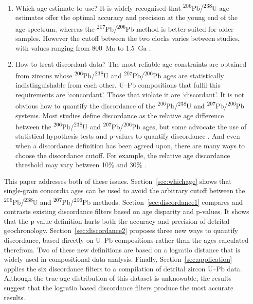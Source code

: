 \documentclass[gchron, manuscript]{copernicus}
\begin{document}
\begin{enumerate}
\item Which age estimate to use? It is widely recognised that
  \textsuperscript{206}Pb/\textsuperscript{238}U age estimates offer
  the optimal accuracy and precision at the young end of the age
  spectrum, whereas the
  \textsuperscript{207}Pb/\textsuperscript{206}Pb method is better
  suited for older samples. However the cutoff between the two clocks
  varies between studies, with values ranging from 800~Ma to 1.5~Ga
  \citep{gehrels2011,spencer2016}.
\item How to treat discordant data? The most reliable age constraints
  are obtained from zircons whose
  \textsuperscript{206}Pb/\textsuperscript{238}U and
  \textsuperscript{207}Pb/\textsuperscript{206}Pb ages are
  statistically indistinguishable from each other. U--Pb compositions
  that fulfil this requirements are `concordant'. Those that violate
  it are `discordant'. It is not obvious how to quantify the
  discordance of the \textsuperscript{206}Pb/\textsuperscript{238}U
  and \textsuperscript{207}Pb/\textsuperscript{206}Pb systems. Most
  studies define discordance as the relative age difference between
  the \textsuperscript{206}Pb/\textsuperscript{238}U and
  \textsuperscript{207}Pb/\textsuperscript{206}Pb ages, but some
  advocate the use of statistical hypothesis tests and p-values to
  quantify discordance \citep{spencer2016}. And even when a
  discordance definition has been agreed upon, there are many ways to
  choose the discordance cutoff. For example, the relative age
  discordance threshold may vary between 10\% and 30\%
  \citep{gehrels2011}.
\end{enumerate}

This paper addresses both of these issues. Section~\ref{sec:whichage}
shows that single-grain concordia ages can be used to avoid the
arbitrary cutoff between the
\textsuperscript{206}Pb/\textsuperscript{238}U and
\textsuperscript{207}Pb/\textsuperscript{206}Pb
methods. Section~\ref{sec:discordance1} compares and contrasts
existing discordance filters based on age disparity and p-values. It
shows that the p-value definition hurts both the accuracy and
precision of detrital geochronology. Section~\ref{sec:discordance2}
proposes three new ways to quantify discordance, based directly on
U--Pb compositions rather than the ages calculated therefrom. Two of
these new definitions are based on a logratio distance that is widely
used in compositional data analysis. Finally,
Section~\ref{sec:application} applies the six discordance filters to a
compilation of detrital zircon U--Pb data. Although the true age
distribution of this dataset is unknowable, the results suggest that
the logratio based discordance filters produce the most accurate
results.
\end{document}
